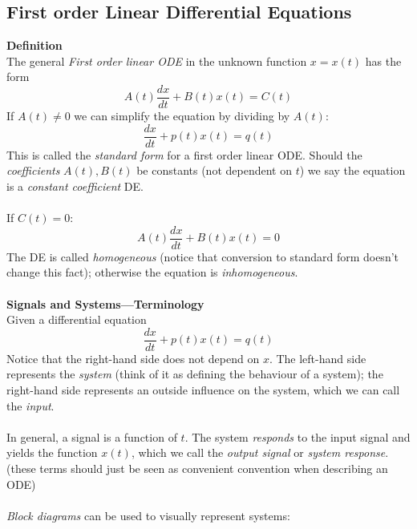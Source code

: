 \documentclass{report}
\begin{document}
\subsection{First order Linear Differential Equations}%
\textbf{Definition}\\
The general \textit{First order linear ODE} in the unknown function $x=x(t)$ has the form
\begin{equation*}
A(t)\frac{dx}{dt}+B(t)x(t)=C(t)
\end{equation*}
If $A(t)\neq0$ we can simplify the equation by dividing by $A(t)$:
\begin{equation*}
\frac{dx}{dt}+p(t)x(t)=q(t)
\end{equation*}
This is called the \textit{standard form} for a first order linear ODE. Should the \textit{coefficients} $A(t),B(t)$
be constants (not dependent on $t$) we say the equation is a \textit{constant coefficient} DE.\\
\vspace{1mm}\\
If $C(t)=0$:
\begin{equation*}
A(t)\frac{dx}{dt}+B(t)x(t)=0
\end{equation*}
The DE is called \textit{homogeneous} (notice that conversion to standard form doesn't change this fact); otherwise
the equation is \textit{inhomogeneous}.\\
\vspace{1mm}\\
\textbf{Signals and Systems---Terminology}\\
Given a differential equation
\begin{equation*}
\frac{dx}{dt}+p(t)x(t)=q(t)
\end{equation*}
Notice that the right-hand side does not depend on $x$. The left-hand side represents the \textit{system}
(think of it as defining the behaviour of a system); the
right-hand side represents an outside influence on the system, which we can call the \textit{input}.\\
\vspace{1mm}\\
In general, a signal is a function of $t$. The system \textit{responds} to the input signal and yields
the function $x(t)$, which we call the \textit{output signal} or \textit{system response}. (these terms should just
be seen as convenient convention when describing an ODE)\\
\vspace{1mm}\\
\textit{Block diagrams} can be used to visually represent systems:
\end{document}
